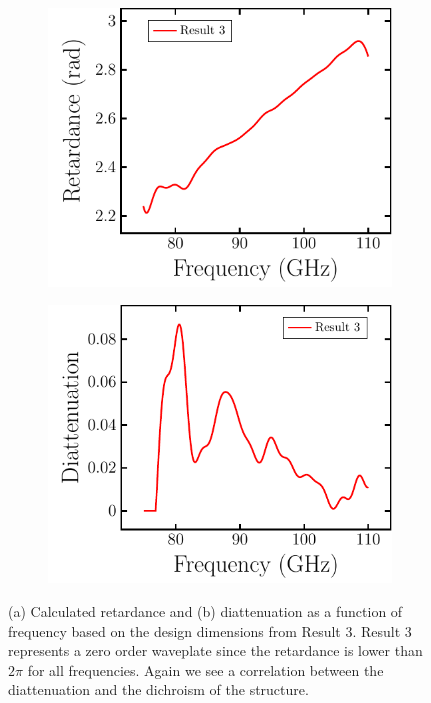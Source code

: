 \begin{figure}[H]
    \begin{subfigure}[b]{.5\linewidth}
    \caption{}\label{}
    \centering\includegraphics[scale=0.55]{images/results/plots/polymer/ret_and_diat_a.pdf}
    \end{subfigure}%
    \begin{subfigure}[b]{.5\linewidth}
    \caption{}\label{}
    \centering\includegraphics[scale=0.55]{images/results/plots/polymer/ret_and_diat_b.pdf}
    \end{subfigure}
    \caption{(a) Calculated retardance and (b) diattenuation as a function of frequency based on the design dimensions from Result 3. Result 3 represents a zero order waveplate since the retardance is lower than $2\pi$ for all frequencies. Again we see a correlation between the diattenuation and the dichroism of the structure.}
    \label{fig:polymer_ret_and_diat}
\end{figure}

